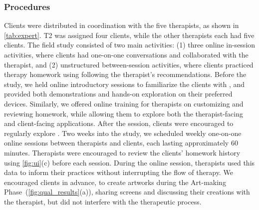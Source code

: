\subsubsection{Procedures}

Clients were distributed in coordination with the five therapists, as shown in \autoref{tab:expert}. T2 was assigned four clients, while the other therapists each had five clients. The field study consisted of two main activities: (1) three online in-session activities, where clients had one-on-one conversations and collaborated with the therapist, and (2) unstructured between-session activities, where clients practiced therapy homework using \name{} following the therapist’s recommendations.
Before the study, we held online introductory sessions to familiarize the clients with \name{}, and provided both demonstrations and hands-on exploration on their preferred devices. Similarly, we offered online training for therapists on customizing and reviewing homework, while allowing them to explore both the therapist-facing and client-facing applications. After the session, clients were encouraged to regularly explore \name{}.
Two weeks into the study, we scheduled weekly one-on-one online sessions between therapists and clients, each lasting approximately 60 minutes. Therapists were encouraged to review the clients' homework history using \autoref{fig:ui}(c) before each session. During the online session, therapists used this data to inform their practices without interrupting the flow of therapy. We encouraged clients in advance, to create artworks during the Art-making Phase~(\autoref{fig:qual_results}(a)), sharing screens and discussing their creations with the therapist, but did not interfere with the therapeutic process.

